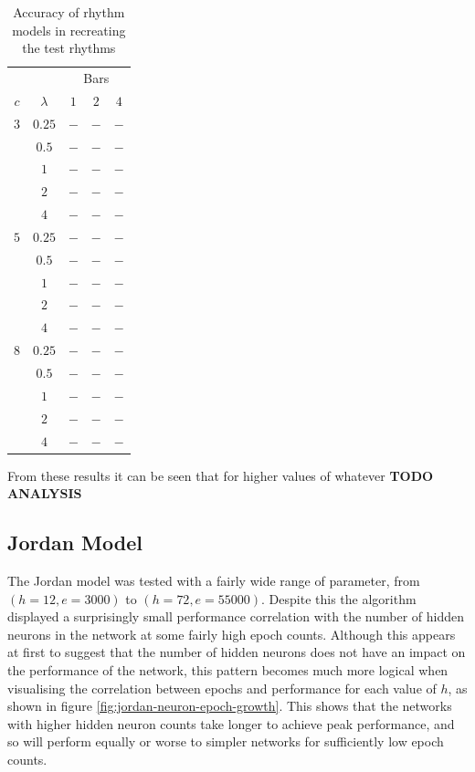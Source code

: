 \documentclass[ author={Stephen Livermore-Tozer},
				supervisor={Dr. Peter Flach},
				degree={MEng},
				title={Algorithmic Co-composition Using Machine Learning},
				subtitle={},
				type={research},
				year={2016} ]{dissertation}
\begin{document}
	\begin{table}[htp]
		\begin{center}
			\begin{tabular}{ccccc}
				\toprule
				& & \multicolumn{3}{c}{Bars}\\
				\cline{3-5}
				$c$ & $\lambda$ & $1$ & $2$ & $4$\\
				\hline
				$3$ & $0.25$ & $-$ & $-$ & $-$\\
				& $0.5$      & $-$ & $-$ & $-$\\
				& $1$        & $-$ & $-$ & $-$\\
				& $2$        & $-$ & $-$ & $-$\\
				& $4$        & $-$ & $-$ & $-$\\
				$5$ & $0.25$ & $-$ & $-$ & $-$\\
				& $0.5$      & $-$ & $-$ & $-$\\
				& $1$        & $-$ & $-$ & $-$\\
				& $2$        & $-$ & $-$ & $-$\\
				& $4$        & $-$ & $-$ & $-$\\
				$8$ & $0.25$ & $-$ & $-$ & $-$\\
				& $0.5$      & $-$ & $-$ & $-$\\
				& $1$        & $-$ & $-$ & $-$\\
				& $2$        & $-$ & $-$ & $-$\\
				& $4$        & $-$ & $-$ & $-$\\
				\bottomrule
			\end{tabular}
		\end{center}
		\caption{Accuracy of rhythm models in recreating the test rhythms}
		\label{tab:rhythm-model-results}
	\end{table}
	
	From these results it can be seen that for higher values of whatever \textbf{TODO ANALYSIS}
	
	\subsection{Jordan Model}
	\label{sec:objective-jordan}
	
	The Jordan model was tested with a fairly wide range of parameter, from $(h = 12, e = 3000)$ to $(h = 72, e = 55000)$. Despite this the algorithm displayed a surprisingly small performance correlation with the number of hidden neurons in the network at some fairly high epoch counts. Although this appears at first to suggest that the number of hidden neurons does not have an impact on the performance of the network, this pattern becomes much more logical when visualising the correlation between epochs and performance for each value of $h$, as shown in figure \ref{fig:jordan-neuron-epoch-growth}. This shows that the networks with higher hidden neuron counts take longer to achieve peak performance, and so will perform equally or worse to simpler networks for sufficiently low epoch counts.
	
\end{document}
